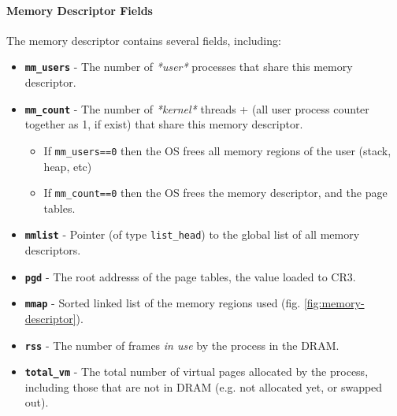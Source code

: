 \documentclass[openany,12pt]{book}
\newcommand{\code}[1]{\texttt{#1}}
\begin{document}
\paragraph{Memory Descriptor Fields} The memory descriptor contains several fields, including:
\begin{itemize}
  \item \textbf{\code{mm\_users}} - The number of \textit{*user*} processes that share this memory descriptor. 

  \item \textbf{\code{mm\_count}} - The number of \textit{*kernel*} threads + (all user process counter together as 1, if exist) that share this memory descriptor.

  \begin{itemize}
    \item If \code{mm\_users==0} then the OS frees all memory regions of the user (stack, heap, etc)

    \item If \code{mm\_count==0} then the OS frees the memory descriptor, and the page tables.
  \end{itemize}

  \item \textbf{\code{mmlist}} - Pointer (of type \code{list\_head}) to the global list of all memory descriptors.

  \item \textbf{\code{pgd}} - The root addresss of the page tables, the value loaded to CR3.

  \item \textbf{\code{mmap}} - Sorted linked list of the memory regions used (fig. \ref{fig:memory-descriptor}). 

  \item \textbf{\code{rss}} - The number of frames \textit{in use} by the process in the DRAM.

  \item \textbf{\code{total\_vm}} - The total number of virtual pages allocated by the process, including those that are not in DRAM (e.g. not allocated yet, or swapped out).
\end{itemize}
\end{document}

